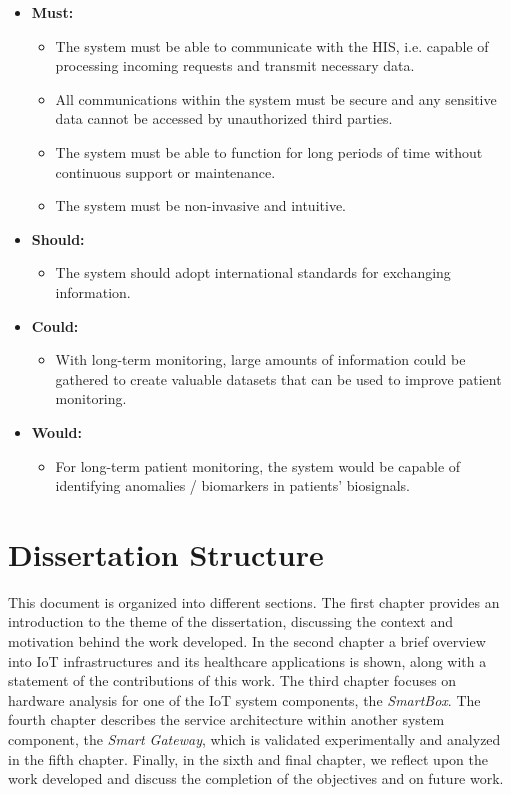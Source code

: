 \begin{itemize}
    \item \textbf{Must:}
    \begin{itemize}
        \item The system must be able to communicate with the \acs{HIS}, i.e. capable of processing incoming requests and transmit necessary data.
        \item All communications within the system must be secure and any sensitive data cannot be accessed by unauthorized third parties.
        \item The system must be able to function for long periods of time without continuous support or maintenance.
        \item The system must be non-invasive and intuitive.
    \end{itemize}
    \item \textbf{Should:}
    \begin{itemize}   
        \item The system should adopt international standards for exchanging information.
    \end{itemize}
    \item \textbf{Could:}
    \begin{itemize}   
        \item With long-term monitoring, large amounts of information could be gathered to create valuable datasets that can be used to improve patient monitoring.
    \end{itemize}
    \item \textbf{Would:}
    \begin{itemize}
        \item For long-term patient monitoring, the system would be capable of identifying anomalies / biomarkers in patients' biosignals.
    \end{itemize}
\end{itemize}

\section{Dissertation Structure}

This document is organized into different sections. The first chapter provides an introduction to the theme of the dissertation, discussing the context and motivation behind the work developed. In the second chapter a brief overview into \acs{IoT} infrastructures and its healthcare applications is shown, along with a statement of the contributions of this work. The third chapter focuses on hardware analysis for one of the \acs{IoT} system components, the \textit{SmartBox}. The fourth chapter describes the service architecture within another system component, the \textit{Smart Gateway}, which is validated experimentally and analyzed in the fifth chapter.
Finally, in the sixth and final chapter, we reflect upon the work developed and discuss the completion of the objectives and on future work.